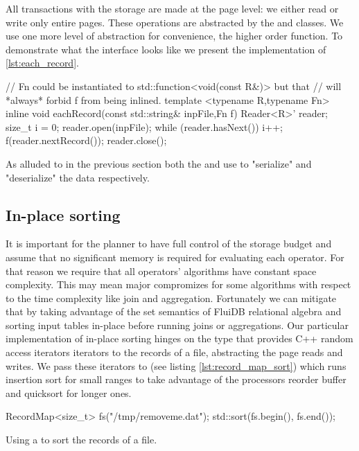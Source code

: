 All transactions with the storage are made at the page level: we
either read or write only entire pages. These operations are
abstracted by the  and  classes. We use one more level
of abstraction for convenience, the higher order 
function. To demonstrate what the interface looks like we present the
implementation of  \ref{lst:each_record}.

\begin{code}
\begin{cppcode}
// Fn could be instantiated to std::function<void(const R&)> but that
// will *always* forbid f from being inlined.
template <typename R,typename Fn>
inline void eachRecord(const std::string& inpFile,Fn f) {
  Reader<R>' reader;
  size_t i = 0;
  reader.open(inpFile);
  while (reader.hasNext()) {
    i++;
    f(reader.nextRecord());
  }
  reader.close();
}
\end{cppcode}
\caption{\label{lst:each_record}}
\end{code}

As alluded to in the previous section both the  and 
use  to "serialize" and "deserialize" the data
respectively.

\subsection{In-place sorting}

It is important for the planner to have full control of the storage
budget and assume that no significant memory is required for
evaluating each operator. For that reason we require that all
operators' algorithms have constant space complexity. This may mean
major compromizes for some algorithms with respect to the time
complexity like join and aggregation. Fortunately we can mitigate that
by taking advantage of the set semantics of FluiDB relational algebra
and sorting input tables in-place before running joins or
aggregations. Our particular implementation of in-place sorting hinges
on the  type that provides C++ random access iterators
iterators to the records of a file, abstracting the page reads and
writes. We pass these iterators to  (see listing
\ref{lst:record_map_sort}) which runs insertion sort for small ranges
to take advantage of the processors reorder buffer and quicksort for
longer ones.

\begin{code}
\begin{cppcode}
RecordMap<size_t> fs("/tmp/removeme.dat");
std::sort(fs.begin(), fs.end());
\end{cppcode}
  \caption{\label{lst:record_map_sort}Using a  to sort
    the records of a file.}
\end{code}


